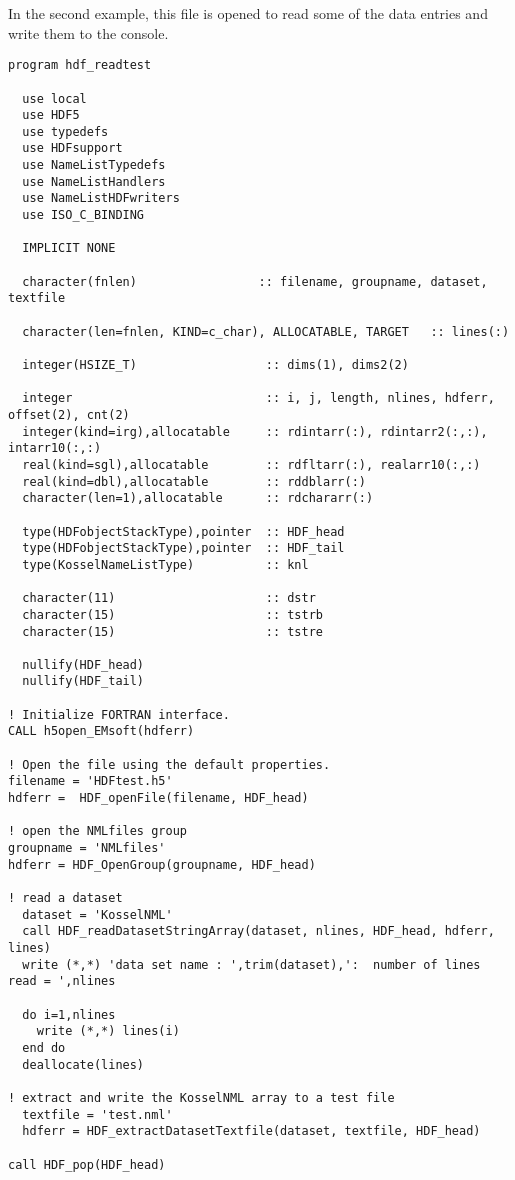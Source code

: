 \documentclass[DIV=calc, paper=letter, fontsize=11pt]{scrartcl}	 %
\begin{document}
In the second example, this file is opened to read some of the data entries and write them to the console.
{\small\begin{verbatim}
program hdf_readtest

  use local
  use HDF5
  use typedefs
  use HDFsupport
  use NameListTypedefs
  use NameListHandlers
  use NameListHDFwriters
  use ISO_C_BINDING
  
  IMPLICIT NONE

  character(fnlen)                 :: filename, groupname, dataset, textfile
  
  character(len=fnlen, KIND=c_char), ALLOCATABLE, TARGET   :: lines(:) 

  integer(HSIZE_T)                  :: dims(1), dims2(2)

  integer                           :: i, j, length, nlines, hdferr, offset(2), cnt(2)
  integer(kind=irg),allocatable     :: rdintarr(:), rdintarr2(:,:), intarr10(:,:)
  real(kind=sgl),allocatable        :: rdfltarr(:), realarr10(:,:)
  real(kind=dbl),allocatable        :: rddblarr(:)
  character(len=1),allocatable      :: rdchararr(:)

  type(HDFobjectStackType),pointer  :: HDF_head
  type(HDFobjectStackType),pointer  :: HDF_tail
  type(KosselNameListType)          :: knl

  character(11)                     :: dstr
  character(15)                     :: tstrb
  character(15)                     :: tstre

  nullify(HDF_head)
  nullify(HDF_tail)

! Initialize FORTRAN interface.
CALL h5open_EMsoft(hdferr)

! Open the file using the default properties.
filename = 'HDFtest.h5'
hdferr =  HDF_openFile(filename, HDF_head)

! open the NMLfiles group
groupname = 'NMLfiles'
hdferr = HDF_OpenGroup(groupname, HDF_head)

! read a dataset
  dataset = 'KosselNML'
  call HDF_readDatasetStringArray(dataset, nlines, HDF_head, hdferr, lines) 
  write (*,*) 'data set name : ',trim(dataset),':  number of lines read = ',nlines

  do i=1,nlines
    write (*,*) lines(i)
  end do
  deallocate(lines)

! extract and write the KosselNML array to a test file 
  textfile = 'test.nml'
  hdferr = HDF_extractDatasetTextfile(dataset, textfile, HDF_head)

call HDF_pop(HDF_head)


\end{verbatim}}
\end{document}
